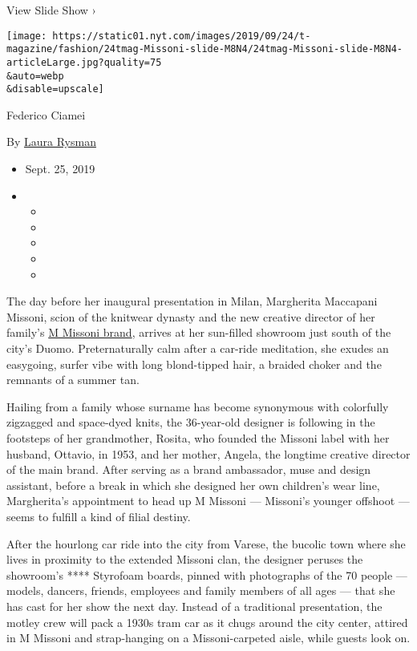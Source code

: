 View Slide Show ›

\texttt{[image: https://static01.nyt.com/images/2019/09/24/t-magazine/fashion/24tmag-Missoni-slide-M8N4/24tmag-Missoni-slide-M8N4-articleLarge.jpg?quality=75\\\&auto=webp\\\&disable=upscale]}

Federico Ciamei

By \href{https://www.nytimes.com/by/laura-rysman}{Laura Rysman}

\begin{itemize}
\item
  Sept. 25, 2019
\item
  \begin{itemize}
  \item
  \item
  \item
  \item
  \item
  \end{itemize}
\end{itemize}

The day before her inaugural presentation in Milan, Margherita Maccapani
Missoni, scion of the knitwear dynasty and the new creative director of
her family's \href{https://www.missoni.com/us/m-missoni}{M Missoni
brand}, arrives at her sun-filled showroom just south of the city's
Duomo. Preternaturally calm after a car-ride meditation, she exudes an
easygoing, surfer vibe with long blond-tipped hair, a braided choker and
the remnants of a summer tan.

Hailing from a family whose surname has become synonymous with
colorfully zigzagged and space-dyed knits, the 36-year-old designer is
following in the footsteps of her grandmother, Rosita, who founded the
Missoni label with her husband, Ottavio, in 1953, and her mother,
Angela, the longtime creative director of the main brand. After serving
as a brand ambassador, muse and design assistant, before a break in
which she designed her own children's wear line, Margherita's
appointment to head up M Missoni --- Missoni's younger offshoot ---
seems to fulfill a kind of filial destiny.

After the hourlong car ride into the city from Varese, the bucolic town
where she lives in proximity to the extended Missoni clan, the designer
peruses the showroom's **** Styrofoam boards, pinned with photographs of
the 70 people --- models, dancers, friends, employees and family members
of all ages --- that she has cast for her show the next day. Instead of
a traditional presentation, the motley crew will pack a 1930s tram car
as it chugs around the city center, attired in M Missoni and
strap-hanging on a Missoni-carpeted aisle, while guests look on.

